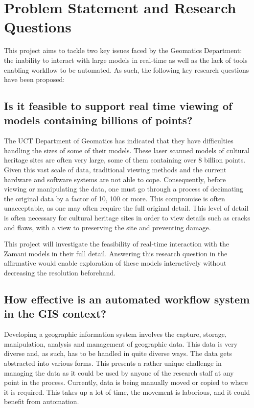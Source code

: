 \documentclass[12pt,a4paper]{article}
\begin{document}
\section{Problem Statement and Research Questions}
This project aims to tackle two key issues faced by the Geomatics Department: the inability to interact with large models in real-time as well as the lack of tools enabling workflow to be automated. As such, the following key research questions have been proposed:
\subsection{Is it feasible to support real time viewing of models containing billions of points?}
The UCT Department of Geomatics has indicated that they have difficulties
handling the sizes of some of their models. These laser scanned models of
cultural heritage sites are often very large, some of them containing over
8 billion points. Given this vast scale of data, traditional viewing methods
and the current hardware and software systems are not able to cope.
Consequently, before viewing or manipulating the data, one must go through
a process of decimating the original data by a factor of 10, 100 or more.
This compromise is often unacceptable, as one may often require the full
original detail. This level of detail is often necessary for cultural heritage
sites in order to view details such as cracks and flaws, with a view to
preserving the site and preventing damage.

This project will investigate the feasibility of real-time interaction with the Zamani models in their full detail. Answering this research question in the affirmative would enable exploration of these models interactively without decreasing the resolution beforehand.
\subsection{How effective is an automated workflow system in the GIS context?}
Developing a geographic information system involves the capture, storage, manipulation, analysis
and management of geographic data. This data is very diverse and, as such, has to be handled
in quite diverse ways. The data gets abstracted into various forms. This presents a
rather unique challenge in managing the data as it could be used by anyone of the research
staff at any point in the process. Currently, data is being manually moved or copied to
where it is required. This takes up a lot of time, the movement is laborious, and it could benefit from automation.
\end{document}
